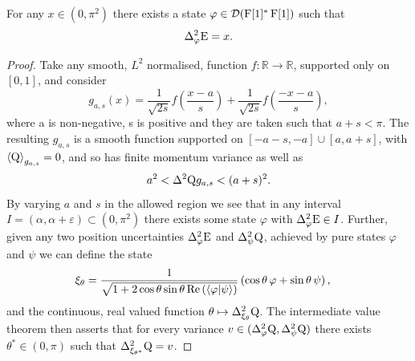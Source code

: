 \begin{lem}\label{lem:box-ur-all-points-filled}
  For any $x\in (0, \pi^2)$ there exists a state $\varphi\in\mathcal{D}(\operatorname{F}[1]^*\operatorname{F}[1])$  such that 
  \begin{align}
    \var[\varphi]{\ope} = x.
  \end{align}
\end{lem}
\begin{proof}
Take any smooth, $L^2$ normalised, function $f: \mathbb{R} \to \mathbb{R}$, supported only on $[0,1]$, and consider
\begin{equation}
	g_{a,s}(x) = \frac{1}{\sqrt{2s}}f\left(\frac{x-a}{s}\right) +\frac{1}{\sqrt{2s}}f\left(\frac{-x-a}{s}\right),
\end{equation}
where a is non-negative, s is positive and they are taken such that $a+s < \pi$. The resulting $g_{a,s}$ is a smooth function supported on $[-a-s, -a] \cup [a,a+s]$, with $\left\langle{\operatorname{Q}}\right\rangle_{g_{a,s}} = 0$, and so has finite momentum variance as well as
\begin{equation}
	a^2 < \var{\opq}{g_{a,s}} < (a+s)^2.
\end{equation}
By varying $a$ and $s$ in the allowed region we see that in any interval $I = (\alpha, \alpha+\varepsilon) \subset (0,\pi^2)$ there exists some state $\varphi$ with $\var[\varphi]{\ope} \in I$. Further, given any two position uncertainties $\var[\varphi]{\ope}$ and $\var[\psi]{\opq}$, achieved by pure states $\varphi$ and $\psi$ we can define the state
\begin{align}
	\xi_\theta &= \frac{1}{\sqrt{1+2\cos\theta\sin\theta\operatorname{Re}\left(\langle \varphi|\psi\rangle\right)}}\left(\cos\theta\,\varphi + \sin\theta\,\psi \right),
\end{align}
and the continuous, real valued function $\theta\mapsto\var[\xi_\theta]{\opq}$. The intermediate value theorem then asserts that for every variance $v\in(\var[\varphi]{\opq},\var[\psi]{\opq})$ there exists $\theta^*\in(0,\pi)$ such that $\var[\xi_{\theta^*}]{\opq} = v$.
\end{proof}

